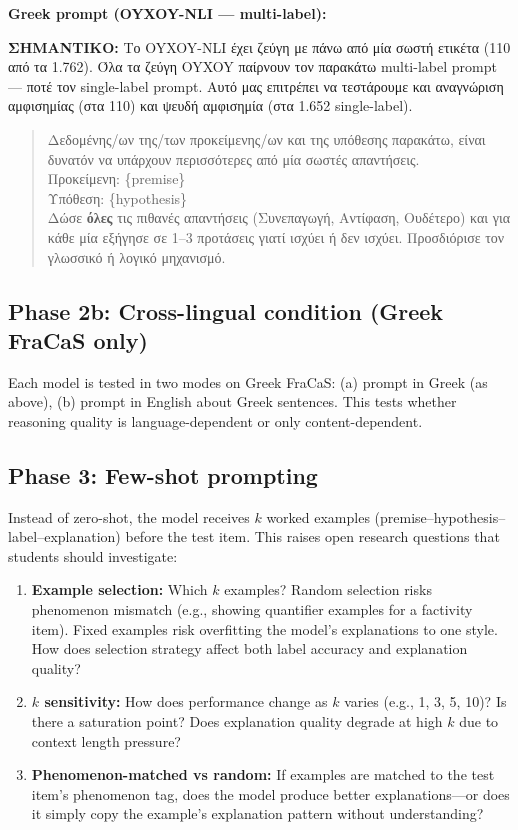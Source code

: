 \documentclass[11pt,a4paper]{article}
\begin{document}
\textbf{Greek prompt (OYXOY-NLI --- multi-label):}

\textbf{ΣΗΜΑΝΤΙΚΟ:} Το OYXOY-NLI έχει ζεύγη με πάνω από μία σωστή ετικέτα (110 από τα 1.762). Όλα τα ζεύγη OYXOY παίρνουν τον παρακάτω multi-label prompt --- ποτέ τον single-label prompt. Αυτό μας επιτρέπει να τεστάρουμε και αναγνώριση αμφισημίας (στα 110) και ψευδή αμφισημία (στα 1.652 single-label).

\begin{quote}\small\ttfamily
Δεδομένης/ων της/των προκείμενης/ων και της υπόθεσης παρακάτω, είναι δυνατόν να υπάρχουν περισσότερες από μία σωστές απαντήσεις.\\[2pt]
Προκείμενη: \{premise\}\\
Υπόθεση: \{hypothesis\}\\[2pt]
Δώσε \textbf{όλες} τις πιθανές απαντήσεις (Συνεπαγωγή, Αντίφαση, Ουδέτερο) και για κάθε μία εξήγησε σε 1--3 προτάσεις γιατί ισχύει ή δεν ισχύει. Προσδιόρισε τον γλωσσικό ή λογικό μηχανισμό.
\end{quote}

\subsection{Phase 2b: Cross-lingual condition (Greek FraCaS only)}

Each model is tested in two modes on Greek FraCaS: (a) prompt in Greek (as above), (b) prompt in English about Greek sentences. This tests whether reasoning quality is language-dependent or only content-dependent.

\subsection{Phase 3: Few-shot prompting}

Instead of zero-shot, the model receives $k$ worked examples (premise--hypothesis--label--explanation) before the test item. This raises open research questions that students should investigate:

\begin{enumerate}[nosep,leftmargin=1.5em]
\item \textbf{Example selection:} Which $k$ examples? Random selection risks phenomenon mismatch (e.g., showing quantifier examples for a factivity item). Fixed examples risk overfitting the model's explanations to one style. How does selection strategy affect both label accuracy and explanation quality?
\item \textbf{$k$ sensitivity:} How does performance change as $k$ varies (e.g., 1, 3, 5, 10)? Is there a saturation point? Does explanation quality degrade at high $k$ due to context length pressure?
\item \textbf{Phenomenon-matched vs random:} If examples are matched to the test item's phenomenon tag, does the model produce better explanations---or does it simply copy the example's explanation pattern without understanding?
\end{enumerate}
\end{document}
